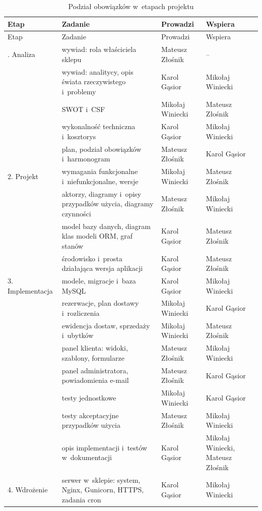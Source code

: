 \documentclass[12pt,a4paper,oneside]{article}
\newcounter{pu}
\begin{document}
\begin{longtable}{@{}L{2.5cm}L{5.4cm}L{3.3cm}L{3.5cm}@{}}
	\caption{Podział obowiązków w~etapach projektu}
	\label{tab:obowiazki}\\
	\toprule
	Etap & Zadanie & Prowadzi & Wspiera \\
	\midrule
	\endfirsthead
	\toprule
	Etap & Zadanie & Prowadzi & Wspiera \\
	\midrule
	\endhead
	\bottomrule
	. Analiza & wywiad: rola właściciela sklepu & Mateusz Złośnik & -- \\
	 & wywiad: analitycy, opis świata rzeczywistego i~problemy & Karol Gąsior & Mikołaj Winiecki \\
	 & SWOT i~CSF & Mikołaj Winiecki & Mateusz Złośnik \\
	 & wykonalność techniczna i~kosztorys & Karol Gąsior & Mikołaj Winiecki \\
	 & plan, podział obowiązków i~harmonogram & Mateusz Złośnik & Karol Gąsior \\
	2. Projekt & wymagania funkcjonalne i~niefunkcjonalne, wersje & Mikołaj Winiecki & Mateusz Złośnik \\
	 & aktorzy, diagramy i~opisy przypadków użycia, diagramy czynności & Mateusz Złośnik & Mikołaj Winiecki \\
	 & model bazy danych, diagram klas modeli ORM, graf stanów & Karol Gąsior & Mateusz Złośnik \\
	 & środowisko i~prosta działająca wersja aplikacji & Karol Gąsior & Mateusz Złośnik \\
	3. Implementacja & modele, migracje i~baza MySQL & Karol Gąsior & Mikołaj Winiecki \\
	 & rezerwacje, plan dostawy i~rozliczenia & Mikołaj Winiecki & Karol Gąsior \\
	 & ewidencja dostaw, sprzedaży i~ubytków & Mikołaj Winiecki & Mateusz Złośnik \\
	 & panel klienta: widoki, szablony, formularze & Mateusz Złośnik & Mikołaj Winiecki \\
	 & panel administratora, powiadomienia e-mail & Mateusz Złośnik & Karol Gąsior \\
	 & testy jednostkowe & Mikołaj Winiecki & Karol Gąsior \\
	 & testy akceptacyjne przypadków użycia & Mateusz Złośnik & Mikołaj Winiecki \\
	 & opis implementacji i~testów w~dokumentacji & Karol Gąsior & Mikołaj Winiecki, Mateusz Złośnik \\
	4. Wdrożenie & serwer w~sklepie: system, Nginx, Gunicorn, HTTPS, zadania cron & Karol Gąsior & Mikołaj Winiecki \\

\end{longtable}
\end{document}
